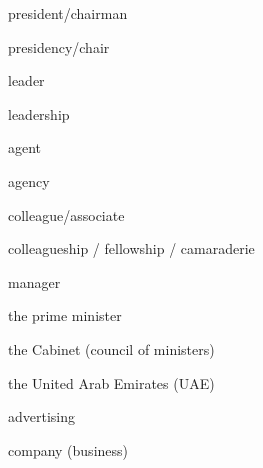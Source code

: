 \begin{flashcard}{\LARGE president/chairman}
\LARGE {}
\end{flashcard}
\begin{flashcard}{\LARGE presidency/chair}
\LARGE {}
\end{flashcard}
\begin{flashcard}{\LARGE leader}
\LARGE {}
\end{flashcard}
\begin{flashcard}{\LARGE leadership}
\LARGE {}
\end{flashcard}
\begin{flashcard}{\LARGE agent}
\LARGE {}
\end{flashcard}
\begin{flashcard}{\LARGE agency}
\LARGE {}
\end{flashcard}
\begin{flashcard}{\LARGE colleague/associate}
\LARGE {}
\end{flashcard}
\begin{flashcard}{\LARGE colleagueship / fellowship / camaraderie}
\LARGE {}
\end{flashcard}
\begin{flashcard}{\LARGE manager}
\LARGE {}
\end{flashcard}
\begin{flashcard}{\LARGE the prime minister}
\LARGE {}
\end{flashcard}
\begin{flashcard}{\LARGE the Cabinet (council of ministers)}
\LARGE {}
\end{flashcard}
\begin{flashcard}{\LARGE the United Arab Emirates (UAE)}
\LARGE {}
\end{flashcard}
\begin{flashcard}{\LARGE advertising}
\LARGE {}
\end{flashcard}
\begin{flashcard}{\LARGE company (business)}
\LARGE {}
\end{flashcard}
